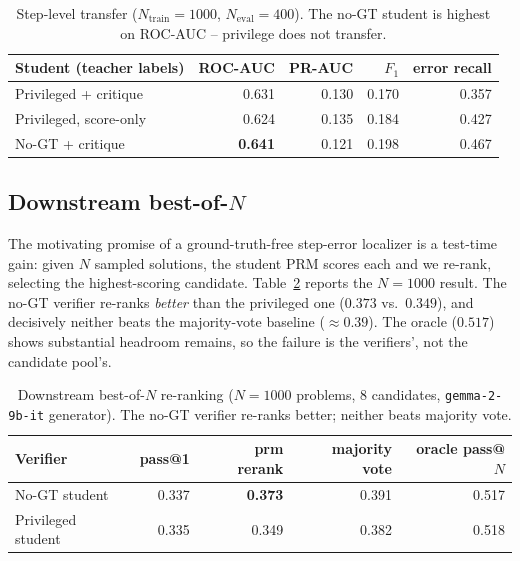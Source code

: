 \documentclass[11pt]{article}
\begin{document}
\begin{table}[t]
\centering
\small
\begin{tabular}{lrrrr}
\toprule
Student (teacher labels) & ROC-AUC & PR-AUC & $F_1$ & error recall \\
\midrule
Privileged + critique & 0.631 & 0.130 & 0.170 & 0.357 \\
Privileged, score-only & 0.624 & 0.135 & 0.184 & 0.427 \\
No-GT + critique & \textbf{0.641} & 0.121 & 0.198 & 0.467 \\
\bottomrule
\end{tabular}
\caption{Step-level transfer ($N_\text{train}=1000$, $N_\text{eval}=400$).
The no-GT student is highest on ROC-AUC -- privilege does not transfer.}
\label{tab:step-transfer}
\end{table}

\subsection{Downstream best-of-$N$}
The motivating promise of a ground-truth-free step-error localizer is a
test-time gain: given $N$ sampled solutions, the student PRM scores each and
we re-rank, selecting the highest-scoring candidate. Table~\ref{tab:bon}
reports the $N=1000$ result. The no-GT verifier re-ranks \emph{better} than
the privileged one ($0.373$ vs.\ $0.349$), and decisively neither beats the
majority-vote baseline ($\approx 0.39$). The oracle ($0.517$) shows
substantial headroom remains, so the failure is the verifiers', not the
candidate pool's.

\begin{table}[t]
\centering
\small
\begin{tabular}{lrrrr}
\toprule
Verifier & pass@1 & prm rerank & majority vote & oracle pass@$N$ \\
\midrule
No-GT student & 0.337 & \textbf{0.373} & 0.391 & 0.517 \\
Privileged student & 0.335 & 0.349 & 0.382 & 0.518 \\
\bottomrule
\end{tabular}
\caption{Downstream best-of-$N$ re-ranking ($N=1000$ problems, 8 candidates,
\texttt{gemma-2-9b-it} generator). The no-GT verifier re-ranks better;
neither beats majority vote.}
\label{tab:bon}
\end{table}
\end{document}
